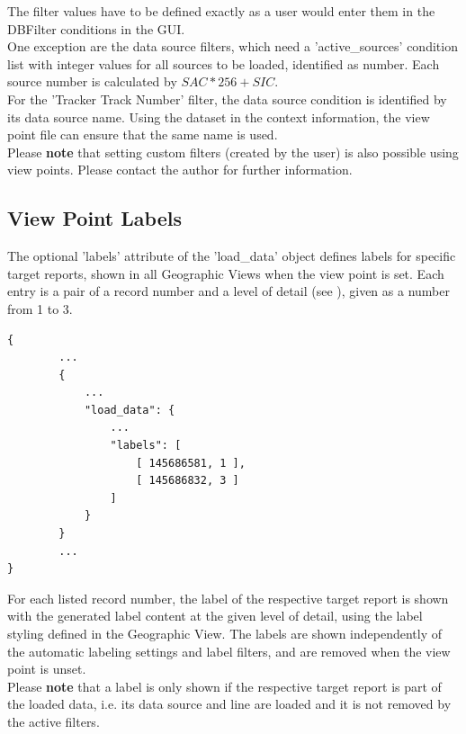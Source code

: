 The filter values have to be defined exactly as a user would enter them in the DBFilter conditions in the GUI. \\

One exception are the data source filters, which need a 'active\_sources' condition list with integer values for all sources to be loaded, identified as number. Each source number is calculated by $SAC*256+SIC$. \\

For the 'Tracker Track Number' filter, the data source condition is identified by its data source name. Using the dataset in the context information, the view point file can ensure that the same name is used. \\

Please \textbf{note} that setting custom filters (created by the user) is also possible using view points. Please contact the author for further information.

\subsection{View Point Labels}
\label{sec:appendix_view_points_labels}

The optional 'labels' attribute of the 'load\_data' object defines labels for specific target reports, shown in all Geographic Views when the view point is set. Each entry is a pair of a record number and a level of detail (see ), given as a number from 1 to 3. \\

\begin{lstlisting}[basicstyle=\small\ttfamily]
{
        ...
        {
            ...
            "load_data": {
                ...
                "labels": [
                    [ 145686581, 1 ],
                    [ 145686832, 3 ]
                ]
            }
        }
        ...
}
\end{lstlisting}

For each listed record number, the label of the respective target report is shown with the generated label content at the given level of detail, using the label styling defined in the Geographic View. The labels are shown independently of the automatic labeling settings and label filters, and are removed when the view point is unset. \\

Please \textbf{note} that a label is only shown if the respective target report is part of the loaded data, i.e. its data source and line are loaded and it is not removed by the active filters.


